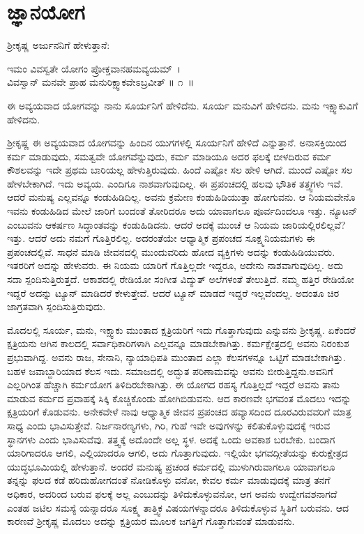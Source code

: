 
\chapter{ಜ್ಞಾನಯೋಗ}

ಶ‍್ರೀಕೃಷ್ಣ ಅರ್ಜುನನಿಗೆ ಹೇಳುತ್ತಾನೆ:

\begin{shloka}
ಇಮಂ ವಿವಸ್ವತೇ ಯೋಗಂ ಪ್ರೋಕ್ತವಾನಹಮವ್ಯಯಮ್~।\\ವಿವಸ್ವಾನ್ ಮನವೇ ಪ್ರಾಹ ಮನುರಿಕ್ಷ್ವಾಕವೇಽಬ್ರವೀತ್ \hfill॥ ೧~॥
\end{shloka}

\begin{artha}
ಈ ಅವ್ಯಯವಾದ ಯೋಗವನ್ನು ನಾನು ಸೂರ್ಯನಿಗೆ ಹೇಳಿದೆನು. ಸೂರ್ಯ ಮನುವಿಗೆ ಹೇಳಿದನು. ಮನು ಇಕ್ಷ್ವಾಕುವಿಗೆ ಹೇಳಿದನು.
\end{artha}

ಶ‍್ರೀಕೃಷ್ಣ ಈ ಅವ್ಯಯವಾದ ಯೋಗವನ್ನು ಹಿಂದಿನ ಯುಗಗಳಲ್ಲಿ ಸೂರ್ಯನಿಗೆ ಹೇಳಿದೆ ಎನ್ನುತ್ತಾನೆ. ಅನಾಸಕ್ತಿಯಿಂದ ಕರ್ಮ ಮಾಡುವುದು, ಸಮತ್ವವೇ ಯೋಗವೆನ್ನುವುದು, ಕರ್ಮ ಮಾಡಿಯೂ ಅದರ ಫಲಕ್ಕೆ ಬೀಳದಿರುವ ಕರ್ಮ ಕೌಶಲವನ್ನು ಇದೇ ಪ್ರಥಮ ಬಾರಿಯಲ್ಲ ಹೇಳುತ್ತಿರುವುದು. ಹಿಂದೆ ಎಷ್ಟೋ ಸಲ ಹೇಳಿ ಆಗಿದೆ. ಮುಂದೆ ಎಷ್ಟೋ ಸಲ ಹೇಳಬೇಕಾಗಿದೆ. ಇದು ಅವ್ಯಯ. ಎಂದಿಗೂ ನಾಶವಾಗುವುದಿಲ್ಲ. ಈ ಪ್ರಪಂಚದಲ್ಲಿ ಹಲವು ಭೌತಿಕ ತತ್ತ್ವಗಳು ಇವೆ. ಆದರೆ ಮನುಷ್ಯ ಎಲ್ಲವನ್ನೂ ಕಂಡುಹಿಡಿದಿಲ್ಲ. ಅವನು ಕ್ರಮೇಣ ಕಂಡುಹಿಡಿಯುತ್ತಾ ಹೋಗುವನು. ಆ ನಿಯಮವೇನೊ ಇವನು ಕಂಡುಹಿಡಿದ ಮೇಲೆ ಜಾರಿಗೆ ಬಂದಂತೆ ತೋರಿದರೂ ಅದು ಯಾವಾಗಲೂ ಪೂರ್ವದಿಂದಲೂ ಇತ್ತು. ನ್ಯೂಟನ್ ಎಂಬುವನು ಆಕರ್ಷಣ ಸಿದ್ಧಾಂತವನ್ನು ಕಂಡುಹಿಡಿದನು. ಆದರೆ ಅದಕ್ಕೆ ಮುಂಚೆ ಆ ನಿಯಮ ಜಾರಿಯಲ್ಲಿರಲಿಲ್ಲವೆ? ಇತ್ತು. ಆದರೆ ಅದು ನಮಗೆ ಗೊತ್ತಿರಲಿಲ್ಲ. ಅದರಂತೆಯೇ ಆಧ್ಯಾತ್ಮಿಕ ಪ್ರಪಂಚದ ಸೂಕ್ಷ್ಮನಿಯಮಗಳು ಈ ಪ್ರಪಂಚದಲ್ಲಿವೆ. ಸಾಧನೆ ಮಾಡಿ ಜೀವನದಲ್ಲಿ ಮುಂದುವರಿದು ಹೋದ ವ್ಯಕ್ತಿಗಳು ಅದನ್ನು ಕಂಡುಹಿಡಿಯುವರು. ಇತರರಿಗೆ ಅದನ್ನು ಹೇಳುವರು. ಈ ನಿಯಮ ಯಾರಿಗೆ ಗೊತ್ತಿಲ್ಲದೇ ಇದ್ದರೂ, ಅದೇನು ನಾಶವಾಗುವುದಿಲ್ಲ. ಅದು ಸದಾ ಸ್ಪಂದಿಸುತ್ತಿರುತ್ತದೆ. ಆಕಾಶದಲ್ಲಿ ರೇಡಿಯೋ ಸಂಗೀತ ವಿದ್ಯುತ್ ಅಲೆಗಳಂತೆ ತೇಲುತ್ತಿದೆ. ನಮ್ಮ ಹತ್ತಿರ ರೇಡಿಯೋ ಇದ್ದರೆ ಅದನ್ನು ಟ್ಯೂನ್ ಮಾಡಿದರೆ ಕೇಳುತ್ತೇವೆ. ಆದರೆ ಟ್ಯೂನ್ ಮಾಡದೆ ಇದ್ದರೆ ಇಲ್ಲವೆಂದಲ್ಲ. ಅದಂತೂ ಚಿರ ಜಾಗ್ರತವಾಗಿ ಸ್ಪಂದಿಸುತ್ತಿರುವುದು.

ಮೊದಲಲ್ಲಿ ಸೂರ್ಯ, ಮನು, ಇಕ್ಷ್ವಾಕು ಮುಂತಾದ ಕ್ಷತ್ರಿಯರಿಗೆ ಇದು ಗೊತ್ತಾಗುವುದು ಎನ್ನುವನು ಶ‍್ರೀಕೃಷ್ಣ. ಏಕೆಂದರೆ ಕ್ಷತ್ರಿಯನು ಆಗಿನ ಕಾಲದಲ್ಲಿ ಸರ್ವಾಧಿಕಾರಿಗಳಾಗಿ ಎಲ್ಲವನ್ನೂ ಮಾಡಬೇಕಾಗಿತ್ತು. ಕರ್ಮಕ್ಷೇತ್ರದಲ್ಲಿ ಅವನು ನಿರಂಕುಶ ಪ್ರಭುವಾಗಿದ್ದ. ಅವನು ರಾಜ, ಸೇನಾನಿ, ನ್ಯಾಯಾಧಿಪತಿ ಮುಂತಾದ ಎಲ್ಲಾ ಕೆಲಸಗಳನ್ನೂ ಒಟ್ಟಿಗೆ ಮಾಡಬೇಕಾಗಿತ್ತು. ಬಹಳ ಜವಾಬ್ದಾರಿಯಾದ ಕೆಲಸ ಇದು. ಸಮಾಜದಲ್ಲಿ ಅದ್ಭುತ ಪರಿಣಾಮವನ್ನು ಅವನು ಬೀರುತ್ತಿದ್ದನು.\break ಅವನಿಗೆ ಎಲ್ಲರಿಗಿಂತ ಹೆಚ್ಚಾಗಿ ಕರ್ಮಯೋಗ ತಿಳಿದಿರಬೇಕಾಗಿತ್ತು. ಈ ಯೋಗದ ರಹಸ್ಯ ಗೊತ್ತಿಲ್ಲದೆ ಇದ್ದರೆ ಅವನು ತಾನು ಮಾಡುವ ಕರ್ಮದ ಪ್ರವಾಹಕ್ಕೆ ಸಿಕ್ಕಿ ಕೊಚ್ಚಿಕೊಂಡು ಹೋಗಿಬಿಡು\-ವನು. ಆದ ಕಾರಣವೇ ಭಗವಂತ ಮೊದಲು ಇದನ್ನು ಕ್ಷತ್ರಿಯರಿಗೆ ಕೊಡುವನು. ಅನೇಕವೇಳೆ ನಾವು ಆಧ್ಯಾತ್ಮಿಕ ಜೀವನ ಪ್ರಪಂಚದ ಹವ್ಯಾಸದಿಂದ ದೂರವಿರುವವರಿಗೆ ಮಾತ್ರ ಸಾಧ್ಯ ಎಂದು ಭಾವಿಸುತ್ತೇವೆ. ನಿರ್ಜನಾರಣ್ಯಗಳು, ಗಿರಿ, ಗುಹೆ ಇವೇ ಅವುಗಳನ್ನು ಕಲಿತುಕೊಳ್ಳುವುದಕ್ಕೆ ಇರುವ ಸ್ಥಾನಗಳು ಎಂದು ಭಾವಿಸುವೆವು. ತತ್ತ್ವಕ್ಕೆ ಅದೊಂದೇ ಅಲ್ಲ ಸ್ಥಳ. ಅದಕ್ಕೆ ಒಂದು ಅವಕಾಶ ಬರಬೇಕು. ಬಂದಾಗ ಯಾರಿಗಾದರೂ ಆಗಲಿ, ಎಲ್ಲಿಯಾದರೂ ಆಗಲಿ, ಅದು ಗೊತ್ತಾಗುವುದು. ಇಲ್ಲಿಯೇ ಭಗವದ್ಗೀತೆಯನ್ನು ಕುರುಕ್ಷೇತ್ರದ ಯುದ್ಧಭೂಮಿಯಲ್ಲಿ ಹೇಳುತ್ತಾನೆ. ಅಂದರೆ ಮನುಷ್ಯ ಪ್ರಚಂಡ ಕರ್ಮದಲ್ಲಿ ಮುಳುಗಿರುವಾಗಲೂ ಯಾವಾಗಲೂ ತನ್ನನ್ನು ಫಲದ ಕಡೆ ಹರಿದುಹೋಗದಂತೆ ನೋಡಿಕೊಳ್ಳು ವನೋ, ಕೇವಲ ಕರ್ಮ ಮಾಡುವುದಕ್ಕೆ ಮಾತ್ರ ತನಗೆ ಅಧಿಕಾರ, ಅದರಿಂದ ಬರುವ ಫಲಕ್ಕೆ ಅಲ್ಲ ಎಂಬುದನ್ನು ತಿಳಿದುಕೊಳ್ಳುವನೋ, ಆಗ ಅವನು ಉದ್ವೇಗವಶನಾಗದೆ ಎಂತಹ ಜಟಿಲ ಸಮಸ್ಯೆ ಯನ್ನಾದರೂ ಸೂಕ್ಷ್ಮ ತಾತ್ತ್ವಿಕ ವಿಷಯಗಳನ್ನಾದರೂ ತಿಳಿದುಕೊಳ್ಳುವ ಸ್ಥಿತಿಗೆ ಬರುವನು. ಆದ ಕಾರಣವೆ ಶ‍್ರೀಕೃಷ್ಣ ಮೊದಲು ಅದನ್ನು ಕ್ಷತ್ರಿಯರ ಮೂಲಕ ಜಗತ್ತಿಗೆ ಗೊತ್ತಾಗುವಂತೆ ಮಾಡುವನು.


